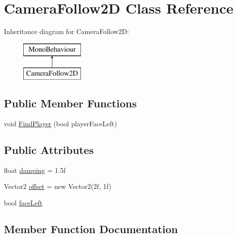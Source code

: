 \hypertarget{class_camera_follow2_d}{}\section{Camera\+Follow2D Class Reference}
\label{class_camera_follow2_d}
Inheritance diagram for Camera\+Follow2D\+:\begin{figure}[H]
\begin{center}
\leavevmode
\includegraphics[height=2.000000cm]{class_camera_follow2_d}
\end{center}
\end{figure}
\subsection*{Public Member Functions}
\begin{DoxyCompactItemize}
\item 
void \mbox{\hyperlink{class_camera_follow2_d_a09ecf131b5803c849f033678a4f7074e}{Find\+Player}} (bool player\+Face\+Left)
\end{DoxyCompactItemize}
\subsection*{Public Attributes}
\begin{DoxyCompactItemize}
\item 
float \mbox{\hyperlink{class_camera_follow2_d_a37c1fc15ec814895aac4cfaef0112682}{damping}} = 1.\+5f
\item 
Vector2 \mbox{\hyperlink{class_camera_follow2_d_ad20b2de59ea17dac96326e9a1471564d}{offset}} = new Vector2(2f, 1f)
\item 
bool \mbox{\hyperlink{class_camera_follow2_d_ac2decd0164a2ea91bfc21fce22561c97}{face\+Left}}
\end{DoxyCompactItemize}


\subsection{Member Function Documentation}
\mbox{\label{class_camera_follow2_d_a09ecf131b5803c849f033678a4f7074e}} 
